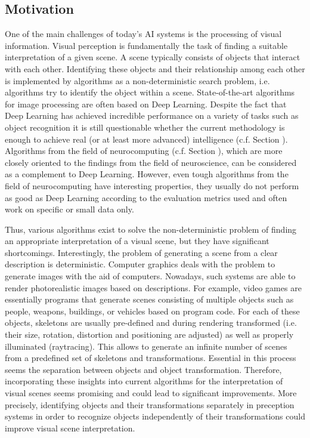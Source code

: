 \subsection{Motivation}
One of the main challenges of today's AI systems is the processing of visual information.
Visual perception is fundamentally the task of finding a suitable interpretation of a given scene.
A scene typically consists of objects that interact with each other.
Identifying these objects and their relationship among each other is implemented by algorithms as a non-deterministic search problem, i.e. algorithms try to identify the object within a scene.
State-of-the-art algorithms for image processing are often based on Deep Learning.
Despite the fact that Deep Learning has achieved incredible performance on a variety of tasks such as object recognition it is still questionable whether the current methodology is enough to achieve real (or at least more advanced) intelligence (c.f. Section ).
Algorithms from the field of neurocomputing (c.f. Section ), which are more closely oriented to the findings from the field of neuroscience, can be considered as a complement to Deep Learning.
However, even tough algorithms from the field of neurocomputing have interesting properties, they usually do not perform as good as Deep Learning according to the evaluation metrics used and often work on specific or small data only.

Thus, various algorithms exist to solve the non-deterministic problem of finding an appropriate interpretation of a visual scene, but they have significant shortcomings.
Interestingly, the problem of generating a scene from a clear description is deterministic.
Computer graphics deals with the problem to generate images with the aid of computers.
Nowadays, such systems are able to render photorealistic images based on descriptions.
For example, video games are essentially programs that generate scenes consisting of multiple objects such as people, weapons, buildings, or vehicles based on program code.
For each of these objects, skeletons are usually pre-defined and during rendering transformed (i.e. their size, rotation, distortion and positioning are adjusted) as well as properly illuminated (raytracing).
This allows to generate an infinite number of scenes from a predefined set of skeletons and transformations.
Essential in this process seems the separation between objects and object transformation.
Therefore, incorporating these insights into current algorithms for the interpretation of visual scenes seems promising and could lead to significant improvements.
More precisely, identifying objects and their transformations separately in preception systems in order to recognize objects independently of their transformations could improve visual scene interpretation.

